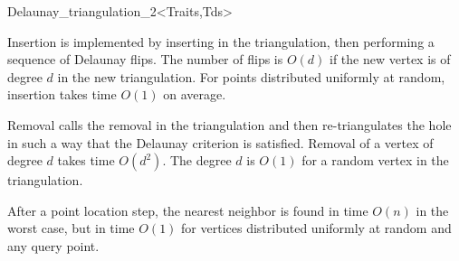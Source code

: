 \begin{ccRefClass}{Delaunay_triangulation_2<Traits,Tds>}

Insertion is implemented by inserting in the triangulation, then
performing a sequence of Delaunay flips. The number of flips is $O(d)$
if the new vertex is of degree $d$ in the new triangulation. For
points distributed uniformly at random, insertion takes time $O(1)$ on
average.

Removal calls the removal in the triangulation and then re-triangulates
the hole in such a way that  the Delaunay criterion is satisfied. Removal of a
vertex of degree $d$ takes time $O(d^2)$.
The degree $d$ is $O(1)$ for a random
vertex in the triangulation.

After a point location step, the nearest neighbor 
is found in time $O(n)$ in the
worst case, but in time $O(1)$
for vertices distributed uniformly at random  and any query point. 


\end{ccRefClass}



